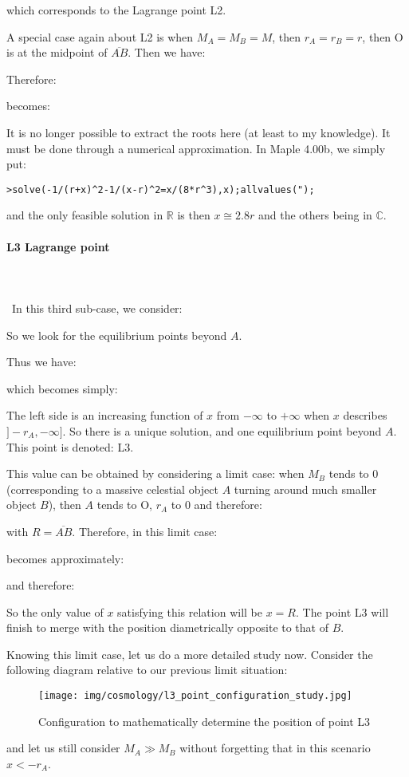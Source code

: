 	which corresponds to the Lagrange point L2.

	A special case again about L2 is when $M_A=M_B=M$, then $r_A=r_B=r$, then O is at the midpoint of $\overline{AB}$. Then we have:
	
	Therefore:
	
	becomes:
	
	It is no longer possible to extract the roots here (at least to my knowledge). It must be done through a numerical approximation. In Maple 4.00b, we simply put:

	\texttt{>solve(-1/(r+x)\string^2-1/(x-r)\string^2=x/(8*r\string^3),x);allvalues(");}
	
	and the only feasible solution in $\mathbb{R}$ is then $x\cong 2.8r$ and the others being in $\mathbb{C}$.
	
	\pagebreak
	\paragraph{L3 Lagrange point}\mbox{}\\\\\
	In this third sub-case, we consider:
	
	So we look for the equilibrium points beyond $A$.

	Thus we have:
	
	which becomes simply:
	
	The left side is an increasing function of $x$ from $-\infty$ to $+\infty$ when $x$ describes $]-r_A,-\infty]$. So there is a unique solution, and one equilibrium point beyond $A$. This point is denoted: L3.

	This value can be obtained by considering a limit case: when $M_B$ tends to $0$ (corresponding to a massive celestial object $A$ turning around much smaller object $B$), then $A$ tends to O, $r_A$ to 0 and therefore:
	
	with $R=\overline{AB}$. Therefore, in this limit case:
	
	becomes approximately:
	
	and therefore:
	
	So the only value of $x$ satisfying this relation will be $x=R$. The point L3 will finish to merge with the position diametrically opposite to that of $B$.

	Knowing this limit case, let us do a more detailed study now. Consider the following diagram relative to our previous limit situation:
	\begin{figure}[H]
		\centering
		\texttt{[image: img/cosmology/l3\_point\_configuration\_study.jpg]}	
		\caption[]{Configuration to mathematically determine the position of point L3}
	\end{figure}
	and let us still consider $M_A \gg M_B$ without forgetting that in this scenario $x<-r_A$.

